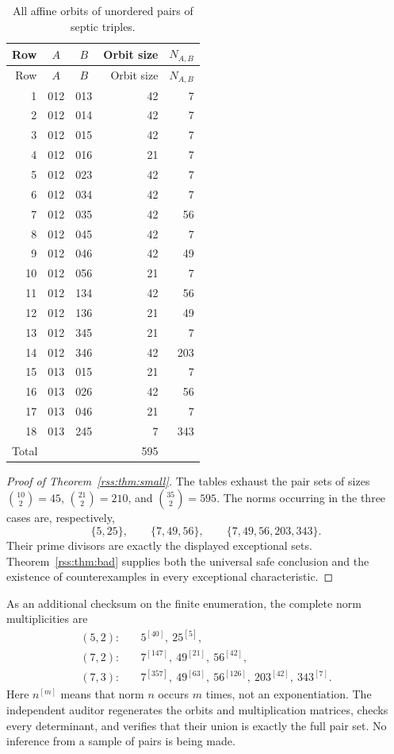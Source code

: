 \documentclass[11pt,a4paper]{article}
\theoremstyle{definition}
\theoremstyle{remark}
\begin{document}
\begin{center}
\begin{longtable}{@{}rccrr@{}}
\caption{All affine orbits of unordered pairs of septic triples.}\label{rss:tab:triples}\\
\toprule
Row&$A$&$B$&Orbit size&$N_{A,B}$\\
\midrule\endfirsthead
\toprule Row&$A$&$B$&Orbit size&$N_{A,B}$\\\midrule\endhead
1&012&013&42&7\\
2&012&014&42&7\\
3&012&015&42&7\\
4&012&016&21&7\\
5&012&023&42&7\\
6&012&034&42&7\\
7&012&035&42&56\\
8&012&045&42&7\\
9&012&046&42&49\\
10&012&056&21&7\\
11&012&134&42&56\\
12&012&136&21&49\\
13&012&345&21&7\\
14&012&346&42&203\\
15&013&015&21&7\\
16&013&026&42&56\\
17&013&046&21&7\\
18&013&245&7&343\\
\midrule
\multicolumn{3}{l}{Total}&595&\\
\bottomrule
\end{longtable}
\end{center}

\begin{proof}[Proof of Theorem~\ref{rss:thm:small}]
The tables exhaust the pair sets of sizes
$\binom{10}{2}=45$, $\binom{21}{2}=210$, and $\binom{35}{2}=595$.
The norms occurring in the three cases are, respectively,
\[
 \{5,25\},\qquad \{7,49,56\},\qquad
 \{7,49,56,203,343\}.
\]
Their prime divisors are exactly the displayed exceptional sets.
Theorem~\ref{rss:thm:bad} supplies both the universal safe conclusion and the
existence of counterexamples in every exceptional characteristic.
\end{proof}

As an additional checksum on the finite enumeration, the complete norm
multiplicities are
\begin{align*}
 (5,2):&\quad 5^{[40]},\ 25^{[5]},\\
 (7,2):&\quad 7^{[147]},\ 49^{[21]},\ 56^{[42]},\\
 (7,3):&\quad 7^{[357]},\ 49^{[63]},\ 56^{[126]},\ 203^{[42]},\ 343^{[7]}.
\end{align*}
Here $n^{[m]}$ means that norm $n$ occurs $m$ times, not an exponentiation.
The independent auditor regenerates the orbits and multiplication matrices,
checks every determinant, and verifies that their union is exactly the full
pair set. No inference from a sample of pairs is being made.
\end{document}

